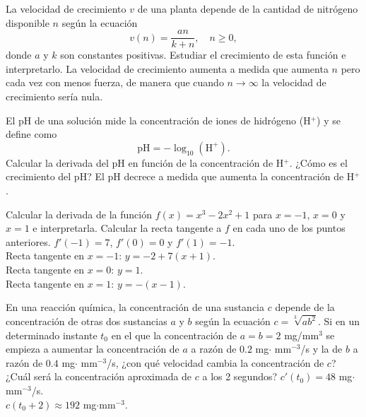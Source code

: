 {La velocidad de crecimiento $v$ de una planta depende de la cantidad de nitrógeno disponible $n$ según la ecuación
\[
v(n) = \frac{an}{k+n},	\quad n\geq 0,
\]
donde $a$ y $k$ son constantes positivas.
Estudiar el crecimiento de esta función e interpretarlo.
}
{La velocidad de crecimiento aumenta a medida que aumenta $n$ pero cada vez con menos fuerza, de manera que cuando $n\rightarrow \infty$ la
velocidad de crecimiento sería nula. }
{
}


{El pH de una solución mide la concentración de iones de hidrógeno (H$^+$) y se define como
\[
\mbox{pH} = -\log_{10}(\mbox{H}^+).
\]
Calcular la derivada del pH en función de la concentración de H$^+$.
¿Cómo es el crecimiento del pH?
}
{El pH decrece a medida que aumenta la concentración de H$^+$.
}
{
}


{Calcular la derivada de la función $f(x)=x^3-2x^2+1$ para $x=-1$, $x=0$ y $x=1$ e interpretarla.
Calcular la recta tangente a $f$ en cada uno de los puntos anteriores.
}
{$f'(-1)=7$, $f'(0)=0$ y $f'(1)=-1$.\\
Recta tangente en $x=-1$: $y=-2+7(x+1)$.\\
Recta tangente en $x=0$: $y=1$.\\
Recta tangente en $x=1$: $y=-(x-1)$.
}
{
}

{
En una reacción química, la concentración de una sustancia $c$ depende de la concentración de otras dos sustancias $a$ y $b$
según la ecuación $c=\sqrt[3]{ab^2}$.
Si en un determinado instante $t_0$ en el que la concentración de $a=b=2$ mg/mm$^3$ se empieza a aumentar la concentración de $a$ a razón de $0.2$ mg$\cdot$ mm$^{-3}$/s y la de $b$ a razón de $0.4$ mg$\cdot$ mm$^{-3}$/s, ¿con qué velocidad cambia la concentración de $c$?
¿Cuál será la concentración aproximada de $c$ a los 2 segundos?
}
{$c'(t_0)=48$ mg$\cdot$mm$^{-3}$/s.\\
$c(t_0+2)\approx 192$  mg$\cdot$mm$^{-3}$.
}
{
}
